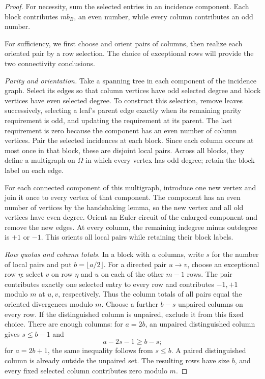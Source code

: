 \documentclass[10pt,a4paper]{amsart}
\newcommand{\cO}{\Omega}
\begin{document}
\begin{proof}
For necessity, sum the selected entries in an incidence component. Each block
contributes $mb_B$, an even number, while every column contributes an odd number.

For sufficiency, we first choose and orient pairs of columns, then realize
each oriented pair by a row selection. The choice of exceptional rows will
provide the two connectivity conclusions.

\emph{Parity and orientation.}
Take a spanning tree in each component of the incidence graph. Select its
edges so that column vertices have odd selected degree and block vertices
have even selected degree. To construct this selection, remove leaves
successively, selecting a leaf's parent edge exactly when its remaining
parity requirement is odd, and updating the requirement at its parent.
The last requirement is zero because the component has an even number of
column vertices.
Pair the selected incidences at each block. Since each column occurs at most
once in that block, these are disjoint local pairs. Across all blocks, they
define a multigraph on $\cO$ in which every vertex has odd degree; retain the
block label on each edge.

For each connected component of this multigraph, introduce one new vertex
and join it once to every vertex of that component. The component has an
even number of vertices by the handshaking lemma, so the new vertex and all
old vertices have even degree. Orient an Euler circuit of the enlarged
component and remove the new edges. At every column, the remaining indegree
minus outdegree is $+1$ or $-1$. This orients all local pairs while retaining
their block labels.

\emph{Row quotas and column totals.}
In a block with $a$ columns, write $s$ for the number of local pairs and put
$b=\lfloor a/2\rfloor$. For a directed pair $u\to v$, choose an exceptional
row $\eta$: select $v$ on row $\eta$ and $u$ on each of the other $m-1$ rows.
The pair contributes exactly one selected entry to every row and contributes
$-1,+1$ modulo $m$ at $u,v$, respectively. Thus the column totals of all
pairs equal the oriented divergences modulo $m$.
Choose a further $b-s$ unpaired columns on every row. If the distinguished
column is unpaired, exclude it from this fixed choice. There are enough
columns: for $a=2b$, an unpaired distinguished column gives $s\le b-1$ and
\[
 a-2s-1\ge b-s;
\]
for $a=2b+1$, the same inequality follows from $s\le b$. A paired
distinguished column is already outside the unpaired set. The resulting
rows have size $b$, and every fixed selected column contributes zero modulo
$m$.


\end{proof}
\end{document}
